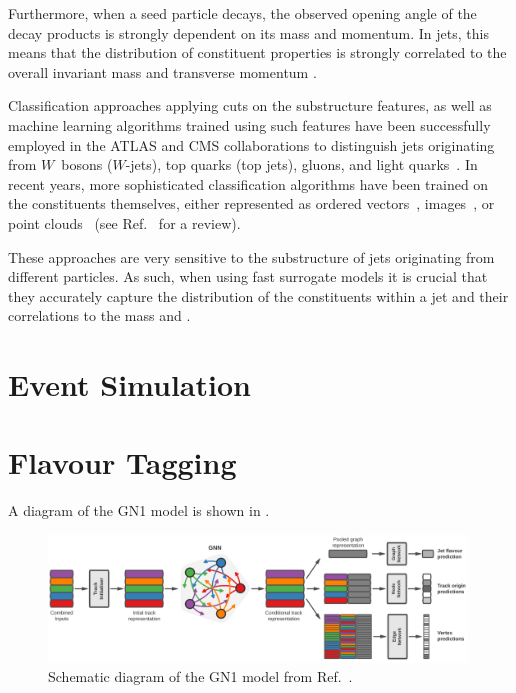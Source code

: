 Furthermore, when a seed particle decays, the observed opening angle of the decay products is strongly dependent on its mass and momentum.
In jets, this means that the distribution of constituent properties is strongly correlated to the overall invariant mass and transverse momentum \pt.

Classification approaches applying cuts on the substructure features, as well as machine learning algorithms trained using such features have been successfully employed in the ATLAS and CMS collaborations to distinguish jets originating from $W$~bosons ($W$-jets), top quarks (top jets), gluons, and light quarks~\cite{ATLAS:2018wis,CMS:2020poo}.
In recent years, more sophisticated classification algorithms have been trained on the constituents themselves, either represented as ordered vectors~\cite{pearkes2017jet,ATLAS:2018wis,CMS:2020poo,Butter_2018}, images~\cite{de_Oliveira_2016,Kasieczka_2017,Macaluso_2018}, or point clouds~\cite{ParticleNet,Komiske:2018cqr,Moreno:2019bmu,Dreyer:2020brq,Dolan:2020qkr,Mikuni:2021pou,Shimmin:2021pkm,Gong:2022lye,Qu:2022mxj} (see Ref.~\cite{TopLandscape} for a review).

These approaches are very sensitive to the substructure of jets originating from different particles.
As such, when using fast surrogate models it is crucial that they accurately capture the distribution of the constituents within a jet and their correlations to the mass and \pt.



\section{Event Simulation}

\section{Flavour Tagging}

A diagram of the GN1 model is shown in .

\begin{figure}
    \centering
    \includegraphics[width=0.99\textwidth]{figures/atlas/gn1.png}
    \caption{Schematic diagram of the GN1 model from Ref.~\cite{GN1}.}
    \label{fig:gn1}
\end{figure}
